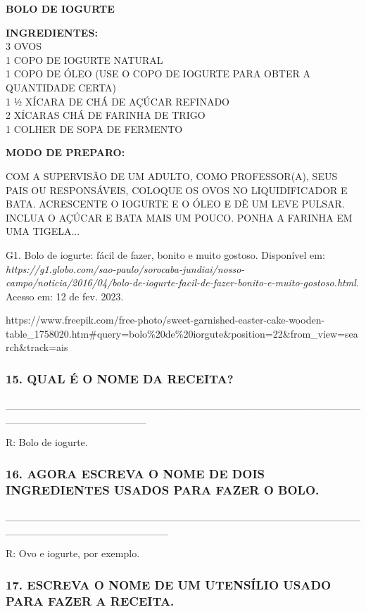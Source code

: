 \textbf{BOLO DE IOGURTE}

\textbf{INGREDIENTES:}\\
3 OVOS\\
1 COPO DE IOGURTE NATURAL\\
1 COPO DE ÓLEO (USE O COPO DE IOGURTE PARA OBTER A QUANTIDADE CERTA)\\
1 ½ XÍCARA DE CHÁ DE AÇÚCAR REFINADO\\
2 XÍCARAS CHÁ DE FARINHA DE TRIGO\\
1 COLHER DE SOPA DE FERMENTO

\textbf{MODO DE PREPARO:}

COM A SUPERVISÃO DE UM ADULTO, COMO PROFESSOR(A), SEUS PAIS OU RESPONSÁVEIS, COLOQUE OS OVOS NO LIQUIDIFICADOR E BATA. ACRESCENTE O IOGURTE E O ÓLEO
E DÊ UM LEVE PULSAR. INCLUA O AÇÚCAR E BATA MAIS UM POUCO. PONHA A
FARINHA EM UMA TIGELA...

G1. Bolo de iogurte: fácil de fazer, bonito e muito gostoso. Disponível em: {\emph{https://g1.globo.com/sao-paulo/sorocaba-jundiai/nosso-campo/noticia/2016/04/bolo-de-iogurte-facil-de-fazer-bonito-e-muito-gostoso.html.}} Acesso em:
12 de fev. 2023.

https://www.freepik.com/free-photo/sweet-garnished-easter-cake-wooden-table\_1758020.htm\#query=bolo\%20de\%20iorgute\&position=22\&from\_view=search\&track=ais

\subsubsection{15. QUAL É O NOME DA
RECEITA?}\label{qual-uxe9-o-nome-da-receita}

\_\_\_\_\_\_\_\_\_\_\_\_\_\_\_\_\_\_\_\_\_\_\_\_\_\_\_\_\_\_\_\_\_\_\_\_\_\_\_\_\_\_\_\_\_\_\_\_\_\_\_\_\_\_\_\_\_\_\_\_\_\_\_\_\_\_\_

R: Bolo de iogurte.

\subsubsection{16. AGORA ESCREVA O NOME DE DOIS INGREDIENTES USADOS PARA
FAZER O BOLO.}\label{agora-escreva-o-nome-de-dois-ingredientes-usados-para-fazer-o-bolo.}

\_\_\_\_\_\_\_\_\_\_\_\_\_\_\_\_\_\_\_\_\_\_\_\_\_\_\_\_\_\_\_\_\_\_\_\_\_\_\_\_\_\_\_\_\_\_\_\_\_\_\_\_\_\_\_\_\_\_\_\_\_\_\_\_\_\_\_\_\_\_

R: Ovo e iogurte, por exemplo.

\subsubsection{17. ESCREVA O NOME DE UM UTENSÍLIO USADO PARA
FAZER A RECEITA.
}\label{escreva-o-nome-de-um-utensuxedlio-que-foi-usado-para-fazer-a-receita.}

